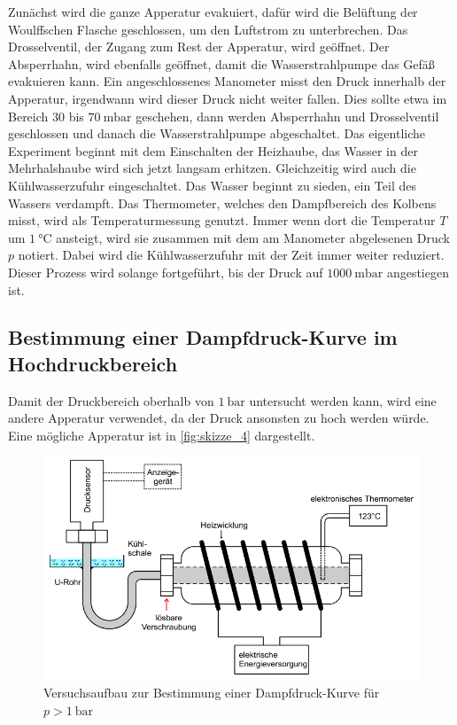 Zunächst wird die ganze Apperatur evakuiert, dafür wird die Belüftung der Woulffschen Flasche geschlossen, um den Luftstrom zu unterbrechen.
Das Drosselventil, der Zugang zum Rest der Apperatur, wird geöffnet.
Der Absperrhahn, wird ebenfalls geöffnet, damit die Wasserstrahlpumpe das Gefäß evakuieren kann.
Ein angeschlossenes Manometer misst den Druck innerhalb der Apperatur, irgendwann wird dieser Druck nicht weiter fallen.
Dies sollte etwa im Bereich $30$ bis $\SI{70}{\milli\bar}$ geschehen, dann werden Absperrhahn und Drosselventil geschlossen und danach die Wasserstrahlpumpe abgeschaltet.
Das eigentliche Experiment beginnt mit dem Einschalten der Heizhaube, das Wasser in der Mehrhalshaube wird sich jetzt langsam erhitzen.
Gleichzeitig wird auch die Kühlwasserzufuhr eingeschaltet.
Das Wasser beginnt zu sieden, ein Teil des Wassers verdampft.
Das Thermometer, welches den Dampfbereich des Kolbens misst, wird als Temperaturmessung genutzt.
Immer wenn dort die Temperatur $T$ um $\SI{1}{\celsius}$ ansteigt, wird sie zusammen mit dem am Manometer abgelesenen Druck $p$ notiert.
Dabei wird die Kühlwasserzufuhr mit der Zeit immer weiter reduziert.
Dieser Prozess wird solange fortgeführt, bis der Druck auf $\SI{1000}{\milli\bar}$ angestiegen ist.

\subsection{Bestimmung einer Dampfdruck-Kurve im Hochdruckbereich}
\label{ssec:Db}

Damit der Druckbereich oberhalb von $\SI{1}{\bar}$ untersucht werden kann, wird eine andere Apperatur verwendet, da der Druck ansonsten zu hoch werden würde.
Eine mögliche Apperatur ist in \autoref{fig:skizze_4} dargestellt.

\begin{figure}
    \centering
    \includegraphics[width=\textwidth]{images/bild4.png}
    \caption{Versuchsaufbau zur Bestimmung einer Dampfdruck-Kurve für $p > \SI{1}{\bar}$ \cite{V203}}
    \label{fig:skizze_4}
\end{figure}

